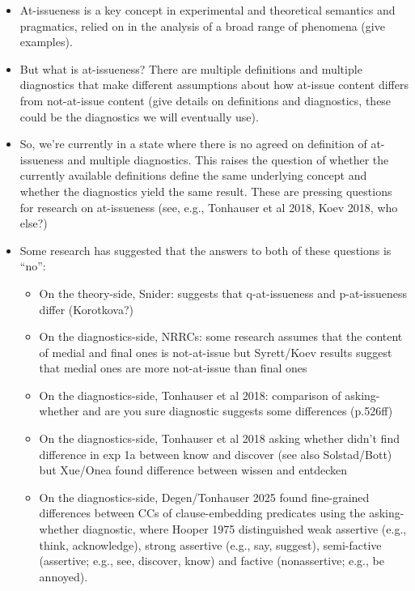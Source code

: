 \documentclass[times,linguex,xcolor]{glossa}
\begin{document}
\begin{itemize}[leftmargin=12pt]

\item At-issueness is a key concept in experimental and theoretical semantics and pragmatics, relied on in the analysis of a broad range of phenomena (give examples). 

\item But what is at-issueness? There are multiple definitions and multiple diagnostics that make different assumptions about how at-issue content differs from not-at-issue content (give details on definitions and diagnostics, these could be the diagnostics we will eventually use).

\item So, we're currently in a state where there is no agreed on definition of at-issueness and multiple diagnostics. This raises the question of whether the currently available definitions define the same underlying concept and whether the diagnostics yield the same result. These are pressing questions for research on at-issueness (see, e.g., Tonhauser et al 2018, Koev 2018, who else?)

\item Some research has suggested that the answers to both of these questions is ``no'':

\begin{itemize}

\item On the theory-side, Snider: suggests that q-at-issueness and p-at-issueness differ (Korotkova?)

\item On the diagnostics-side, NRRCs: some research assumes that the content of medial and final ones is not-at-issue but Syrett/Koev results suggest that medial ones are more not-at-issue than final ones

\item On the diagnostics-side, Tonhauser et al 2018: comparison of asking-whether and are you sure diagnostic suggests some differences (p.526ff)

\item On the diagnostics-side, Tonhauser et al 2018 asking whether didn't find difference in exp 1a between know and discover (see also Solstad/Bott) but Xue/Onea found difference between wissen and entdecken

\item On the diagnostics-side, Degen/Tonhauser 2025 found fine-grained differences between CCs of clause-embedding predicates using the asking-whether diagnostic, where Hooper 1975 distinguished weak assertive (e.g., think, acknowledge), strong assertive (e.g., say, suggest), semi-factive (assertive; e.g., see, discover, know) and factive (nonassertive; e.g., be annoyed).



\end{itemize}
\end{itemize}
\end{document}

